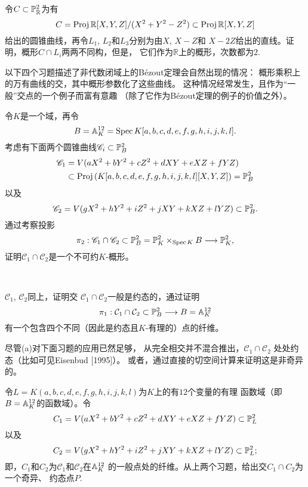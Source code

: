 \begin{exe}\label{exe:3.72}
令$C\subset \P_{\mathbb R}^2$为有
\[
	C=\proj \mathbb R[X,Y,Z]/(X^2+Y^2-Z^2)
	\subset \proj \mathbb R[X,Y,Z]
\]
给出的圆锥曲线，再令$L_1$, $L_2$和$L_3$分别为由$X$, $X-Z$和
$X-2Z$给出的直线。证明，概形$C\cap L_i$两两不同构，但是，
它们作为$\mathbb R$上的概形，次数都为$2$.
\end{exe}


以下四个习题描述了非代数闭域上的B\'ezout定理会自然出现的情况：
概形乘积上的万有曲线的交，其中概形参数化了这些曲线。
这种情况经常发生，且作为“一般”交点的一个例子而富有意趣
（除了它作为B\'ezout定理的例子的价值之外）。

\begin{exe}\label{exe:3.73}
令$K$是一个域，再令
\[
	B=\A_K^{12}=\spec K[a,b,c,d,e,f,g,h,i,j,k,l].
\]
考虑有下面两个圆锥曲线$\mathscr C_i\subset \P_B^2$
\begin{align*}
	\mathscr C_1&=V(aX^2+bY^2+cZ^2+dXY+eXZ+fYZ)\\
	&\subset \proj\left(
	K[a,b,c,d,e,f,g,h,i,j,k,l][X,Y,Z]
	\right)=\P_B^2
\end{align*}
以及
\[
	\mathscr C_2=
	V(gX^2+hY^2+iZ^2+jXY+kXZ+lYZ)\subset \P_B^2.
\]
通过考察投影
\[
	\pi_2:\mathscr C_1\cap \mathscr C_2
	\subset \P_B^2=\P_K^2\times_{\spec K}B
	\longrightarrow \P_K^2,
\]
证明$\mathscr C_1\cap \mathscr C_2$是一个不可约$K$-概形。
\end{exe}

\begin{exe}~\label{exe:3.74}
\begin{compactenum}[(a)]
	\item $\mathscr C_1$, $\mathscr C_2$同上，证明交
	$\mathscr C_1\cap \mathscr C_2$一般是约态的，通过证明
	\[
		\pi_1:\mathcal C_1\cap \mathcal C_2\subset \P_B^2
		\longrightarrow B=\A_K^{12}
	\]
	有一个包含四个不同（因此是约态且$K$-有理的）点的纤维。
	\item 尽管(a)对下面习题的应用已然足够，
	从完全相交并不混合推出，$\mathscr C_1\cap \mathscr C_2$
	处处约态（比如可见Eisenbud [1995]）。
	或者，通过直接的切空间计算来证明这是非奇异的。
\end{compactenum}
\end{exe}

\begin{exe}\label{exe:3.75}
令$L=K(a,b,c,d,e,f,g,h,i,j,k,l)$为$K$上的有$12$个变量的有理
函数域（即$B=\A_K^{12}$的函数域）。令
\[
	C_1=V(aX^2+bY^2+cZ^2+dXY+eXZ+fYZ)\subset \P_L^2
\]
以及
\[
	C_2=V(gX^2+hY^2+iZ^2+jXY+kXZ+lYZ)\subset \P_L^2;
\]
即，$C_1$和$C_2$为$\mathscr C_1$和$\mathscr C_2$在$\A_K^{12}$
的一般点处的纤维。从上两个习题，给出交$C_1\cap C_2$为一个奇异、
约态点$P$.
\end{exe}

